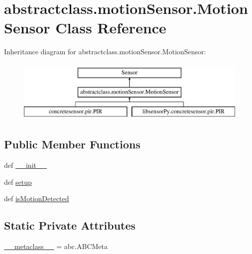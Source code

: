 \hypertarget{classabstractclass_1_1motionSensor_1_1MotionSensor}{}\section{abstractclass.\+motion\+Sensor.\+Motion\+Sensor Class Reference}
\label{classabstractclass_1_1motionSensor_1_1MotionSensor}
Inheritance diagram for abstractclass.\+motion\+Sensor.\+Motion\+Sensor\+:\begin{figure}[H]
\begin{center}
\leavevmode
\includegraphics[height=3.000000cm]{classabstractclass_1_1motionSensor_1_1MotionSensor}
\end{center}
\end{figure}
\subsection*{Public Member Functions}
\begin{DoxyCompactItemize}
\item 
def \hyperlink{classabstractclass_1_1motionSensor_1_1MotionSensor_a4e43c036f43fcd3ee6de661ff4166493}{\+\_\+\+\_\+init\+\_\+\+\_\+}
\item 
def \hyperlink{classabstractclass_1_1motionSensor_1_1MotionSensor_a6ef3b9bd81e06a3f8691f15186075102}{setup}
\item 
def \hyperlink{classabstractclass_1_1motionSensor_1_1MotionSensor_acd53fb21a64ca2789e2a85bc158a15cd}{is\+Motion\+Detected}
\end{DoxyCompactItemize}
\subsection*{Static Private Attributes}
\begin{DoxyCompactItemize}
\item 
\hyperlink{classabstractclass_1_1motionSensor_1_1MotionSensor_a2a34af48a6a85911cb416da5de6d7828}{\+\_\+\+\_\+metaclass\+\_\+\+\_\+} = abc.\+A\+B\+C\+Meta
\end{DoxyCompactItemize}



